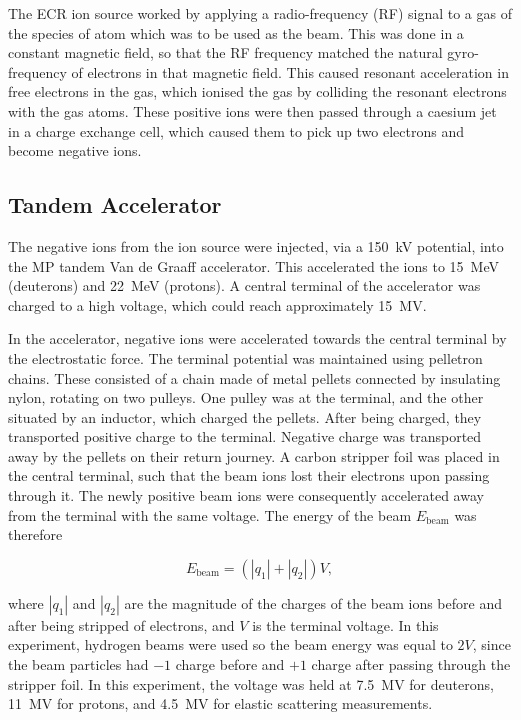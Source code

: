 The ECR ion source worked by applying a radio-frequency (RF) signal to a gas of the species of atom which was to be used as the beam. This was done in a constant magnetic field, so that the RF frequency matched the natural gyro-frequency of electrons in that magnetic field. This caused resonant acceleration in free electrons in the gas, which ionised the gas by colliding the resonant electrons with the gas atoms. These positive ions were then passed through a caesium jet in a charge exchange cell, which caused them to pick up two electrons and become negative ions.


\subsection{Tandem Accelerator}
The negative ions from the ion source were injected, via a \SI{150}{\kilo\volt} potential, into the MP tandem Van de Graaff accelerator. This accelerated the ions to \SI{15}{\mega\electronvolt} (deuterons) and \SI{22}{\mega\electronvolt} (protons). A central terminal of the accelerator was charged to a high voltage, which could reach approximately \SI{+15}{\mega\volt}\cite{highvoltage}. 

In the accelerator, negative ions were accelerated towards the central terminal by the electrostatic force. The terminal potential was maintained using pelletron chains. These consisted of a chain made of metal pellets connected by insulating nylon, rotating on two pulleys. One pulley was at the terminal, and the other situated by an inductor, which charged the pellets. After being charged, they transported positive charge to the terminal. Negative charge was transported away by the pellets on their return journey. A carbon stripper foil was placed in the central terminal, such that the beam ions lost their electrons upon passing through it. The newly positive beam ions were consequently accelerated away from the terminal with the same voltage. The energy of the beam $E_{\mathrm{beam}}$ was therefore

\begin{equation}
E_{\mathrm{beam}} = (|q_1| + |q_2|)V\mathrm{,}
\end{equation}

where $|q_1|$ and $|q_2|$ are the magnitude of the charges of the beam ions before and after being stripped of electrons, and $V$ is the terminal voltage. In this experiment, hydrogen beams were used so the beam energy was equal to $2V$, since the beam particles had $-1$ charge before and $+1$ charge after passing through the stripper foil. In this experiment, the voltage was held at \SI{7.5}{\mega\volt} for deuterons, \SI{11}{\mega\volt} for protons, and \SI{4.5}{\mega\volt} for elastic scattering measurements.

